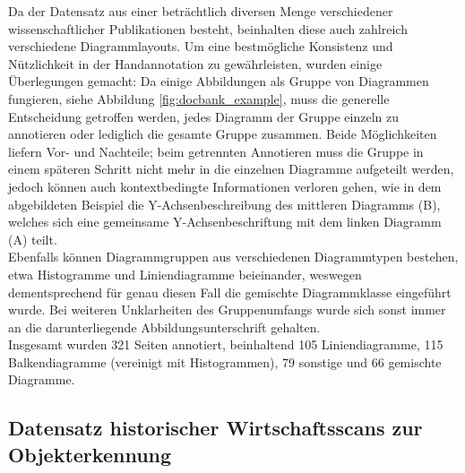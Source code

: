 Da der Datensatz aus einer beträchtlich diversen Menge verschiedener wissenschaftlicher Publikationen besteht, beinhalten diese auch zahlreich verschiedene Diagrammlayouts. Um eine bestmögliche Konsistenz und Nützlichkeit in der Handannotation zu gewährleisten, wurden einige Überlegungen gemacht: Da einige Abbildungen als Gruppe von Diagrammen fungieren, siehe Abbildung \ref{fig:docbank_example}, muss die generelle Entscheidung getroffen werden, jedes Diagramm der Gruppe einzeln zu annotieren oder lediglich die gesamte Gruppe zusammen. Beide Möglichkeiten liefern Vor- und Nachteile; beim getrennten Annotieren muss die Gruppe in einem späteren Schritt nicht mehr in die einzelnen Diagramme aufgeteilt werden, jedoch können auch kontextbedingte Informationen verloren gehen, wie in dem abgebildeten Beispiel die Y-Achsenbeschreibung des mittleren Diagramms (B), welches sich eine gemeinsame Y-Achsenbeschriftung mit dem linken Diagramm (A) teilt.
\\
Ebenfalls können Diagrammgruppen aus verschiedenen Diagrammtypen bestehen, etwa Histogramme und Liniendiagramme beieinander, weswegen dementsprechend für genau diesen Fall die gemischte Diagrammklasse eingeführt wurde. Bei weiteren Unklarheiten des Gruppenumfangs wurde sich sonst immer an die darunterliegende Abbildungsunterschrift gehalten.
\\
Insgesamt wurden 321 Seiten annotiert, beinhaltend 105 Liniendiagramme, 115 Balkendiagramme (vereinigt mit Histogrammen), 79 sonstige und 66 gemischte Diagramme.

\subsection{Datensatz historischer Wirtschaftsscans zur Objekterkennung}
\label{ch:scanbank}

